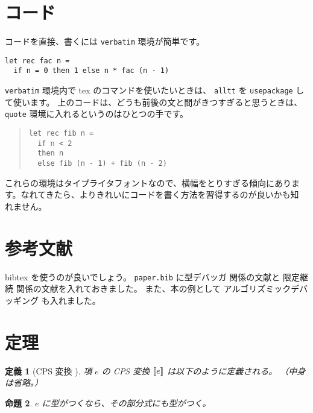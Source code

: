 \documentclass[twoside, twocolumn, a4paper]{jarticle}
\newtheorem{definition}{定義}
\newtheorem{proposition}[definition]{命題}
\begin{document}
\section{コード}\label{sec:code}
コードを直接、書くには \texttt{verbatim} 環境が簡単です。
\begin{verbatim}
let rec fac n =
  if n = 0 then 1 else n * fac (n - 1)
\end{verbatim}
\texttt{verbatim} 環境内で tex のコマンドを使いたいときは、
\texttt{alltt} を \texttt{usepackage} して使います。
上のコードは、どうも前後の文と間がきつすぎると思うときは、
\texttt{quote} 環境に入れるというのはひとつの手です。
\begin{quote}
\begin{verbatim}
let rec fib n =
  if n < 2
  then n
  else fib (n - 1) + fib (n - 2)
\end{verbatim}
\end{quote}

これらの環境はタイプライタフォントなので、横幅をとりすぎる傾向にありま
す。なれてきたら、よりきれいにコードを書く方法を習得するのが良いかも知
れません。

\section{参考文献}\label{sec:bunken}
bibtex を使うのが良いでしょう。
\texttt{paper.bib} に型デバッガ \cite{TA2013} 関係の文献と
限定継続 \cite{DF1989, DF1990} 関係の文献を入れておきました。
また、本の例として
アルゴリズミックデバッギング \cite{Shapiro1983} も入れました。

\section{定理}\label{sec:theorem}
\begin{definition}[CPS 変換 \cite{Plotkin1975}]
\upshape %
項 $e$ の CPS 変換 $[\![{e]\!]}$ は以下のように定義される。
（中身は省略。）
\end{definition}

\begin{proposition}
$e$ に型がつくなら、その部分式にも型がつく。
\end{proposition}
\end{document}
